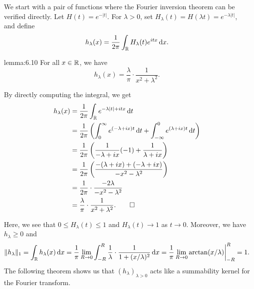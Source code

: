 We start with a pair of functions where the Fourier inversion theorem 
can be verified directly. Let $H(t) = e^{-|t|}$. For $\lambda > 0$, 
set $H_\lambda(t) = H(\lambda t) = e^{-\lambda|t|}$, and define 
\[ h_\lambda(x) = \frac{1}{2\pi} \int_{\mathbb{R}} H_\lambda(t) e^{itx}\,\mathrm{d} x. \] 

\begin{lemma}{lemma:6.10}
    For all $x \in \mathbb{R}$, we have 
    \[ h_\lambda(x) = \frac{\lambda}{\pi} \cdot \frac{1}{x^2 + \lambda^2}. \] 
\end{lemma}
\begin{pf}
    By directly computing the integral, we get 
    \begin{align*}
        h_{\lambda}(x) &= \frac{1}{2\pi} \int_{\mathbb{R}} e^{-\lambda|t|+itx}\,\mathrm{d} t \\ 
        &= \frac{1}{2\pi} \left( \int_0^\infty e^{(-\lambda+ix)t}\,\mathrm{d} t 
        + \int_{-\infty}^0 e^{(\lambda+ix)t} \,\mathrm{d} t \right) \\ 
        &= \frac{1}{2\pi} \left( \frac{1}{-\lambda+ix} (-1) + \frac{1}{\lambda+ix} \right) \\ 
        &= \frac{1}{2\pi} \left( \frac{-(\lambda + ix) + (-\lambda+ix)}{-x^2-\lambda^2} \right) \\ 
        &= \frac{1}{2\pi} \cdot \frac{-2\lambda}{-x^2-\lambda^2} \\
        &= \frac{\lambda}{\pi} \cdot \frac{1}{x^2+\lambda^2}. \qedhere 
    \end{align*}
\end{pf}
Here, we see that $0 \leq H_\lambda(t) \leq 1$ and $H_\lambda(t) \to 1$ 
as $t \to 0$. Moreover, we have $h_\lambda \geq 0$ and 
\[ \|h_\lambda\|_1 = \int_{\mathbb{R}} h_\lambda(x) \,\mathrm{d} x = 
\frac{1}{\pi} \lim_{R\to0} \int_{-R}^R \frac{1}{\lambda} \cdot 
\frac{1}{1 + (x/\lambda)^2}\,\mathrm{d} x = \frac{1}{\pi} \lim_{R\to0} 
\arctan(x/\lambda) \bigg|_{-R}^R = 1. \] 
The following theorem shows us that $(h_\lambda)_{\lambda > 0}$ acts like a 
summability kernel for the Fourier transform. 

